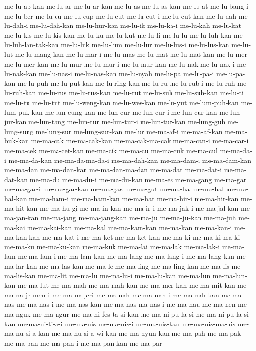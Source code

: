 {me-lu-ap-kan me-lu-ar me-lu-ar-kan me-lu-as me-lu-as-kan me-lu-at
me-lu-bang-i me-lu-ber me-lu-cu me-lu-cup me-lu-cut me-lu-cut-i
me-lu-cut-kan me-lu-dah me-lu-dah-i me-lu-dah-kan me-lu-hur-kan me-lu-ik
me-lu-ka-i me-lu-kah me-lu-kat me-lu-kis me-lu-kis-kan me-lu-ku me-lu-kut
me-lu-li me-lu-lu me-lu-luh-kan me-lu-luh-lan-tak-kan me-lu-luk me-lu-lum
me-lu-lur me-lu-lus-i me-lu-lus-kan me-lu-lut me-lu-mang-kan me-lu-mar-i
me-lu-mas me-lu-mat me-lu-mat-kan me-lu-mer me-lu-mer-kan me-lu-mur
me-lu-mur-i me-lu-mur-kan me-lu-nak me-lu-nak-i me-lu-nak-kan me-lu-nas-i
me-lu-nas-kan me-lu-nyah me-lu-pa me-lu-pa-i me-lu-pa-kan me-lu-puh
me-lu-put-kan me-lu-ring-kan me-lu-ru me-lu-rub-i me-lu-ruh me-lu-ruh-kan
me-lu-rus me-lu-rus-kan me-lu-rut me-lu-suh me-lu-suh-kan me-lu-ti
me-lu-tu me-lu-tut me-lu-weng-kan me-lu-wes-kan me-lu-yut me-lum-puh-kan
me-lum-puk-kan me-lun-cung-kan me-lun-cur me-lun-cur-i me-lun-cur-kan
me-lun-jur-kan me-lun-tang me-lun-tur me-lun-tur-i me-lun-tur-kan
me-lung-guh me-lung-sung me-lung-sur me-lung-sur-kan me-lur me-ma-af-i
me-ma-af-kan me-ma-buk-kan me-ma-cak me-ma-cak-kan me-ma-cak-ma-cak
me-ma-can-i me-ma-car-i me-ma-cek me-ma-cet-kan me-ma-cik me-ma-cu
me-ma-cuk me-ma-cul me-ma-da-i me-ma-da-kan me-ma-da-ma-da-i me-ma-dah-kan
me-ma-dam-i me-ma-dam-kan me-ma-dan me-ma-dan-kan me-ma-dan-ma-dan
me-ma-dat me-ma-dat-i me-ma-dat-kan me-ma-du me-ma-du-i me-ma-du-kan
me-ma-es me-ma-gang me-ma-gar me-ma-gar-i me-ma-gar-kan me-ma-gas
me-ma-gut me-ma-ha me-ma-hal me-ma-hal-kan me-ma-ham-i me-ma-ham-kan
me-ma-hat me-ma-hir-i me-ma-hir-kan me-ma-hit-kan me-ma-hu-gi me-ma-in-kan
me-ma-ir-i me-ma-jak-i me-ma-jal-kan me-ma-jan-kan me-ma-jang
me-ma-jang-kan me-ma-ju me-ma-ju-kan me-ma-juh me-ma-kai me-ma-kai-kan
me-ma-kal me-ma-kam-kan me-ma-kan me-ma-kan-i me-ma-kan-kan me-ma-kat-i
me-ma-ket me-ma-ket-kan me-ma-ki me-ma-ki-ma-ki me-ma-ku me-ma-ku-kan
me-ma-kuk me-ma-lai me-ma-lak me-ma-lak-i me-ma-lam me-ma-lam-i
me-ma-lam-kan me-ma-lang me-ma-lang-i me-ma-lang-kan me-ma-lar-kan
me-ma-las-kan me-ma-le me-ma-ling me-ma-ling-kan me-ma-lis me-ma-lis-kan
me-ma-lit me-ma-lu me-ma-lu-i me-ma-lu-kan me-ma-lun me-ma-lun-kan
me-ma-lut me-ma-mah me-ma-mah-kan me-ma-mer-kan me-ma-mit-kan
me-ma-na-je-men-i me-ma-na-jeri me-ma-nah me-ma-nah-i me-ma-nah-kan
me-ma-nas me-ma-nas-i me-ma-nas-kan me-ma-nas-ma-nas-i me-ma-nau me-ma-nen
me-ma-nguk me-ma-ngur me-ma-ni-fes-ta-si-kan me-ma-ni-pu-la-si
me-ma-ni-pu-la-si-kan me-ma-ni-ti-a-i me-ma-nis me-ma-nis-i me-ma-nis-kan
me-ma-nis-ma-nis me-ma-nu-si-a-kan me-ma-nu-si-a-wi-kan me-ma-nyun-kan
me-ma-pah me-ma-pak me-ma-pan me-ma-pan-i me-ma-pan-kan me-ma-par
}
